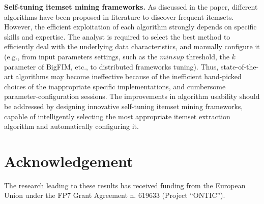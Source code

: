 \documentclass[preprint,review,12pt]{elsarticle}
\begin{document}
\textbf{Self-tuning itemset mining frameworks.} 
As discussed in the paper, different algorithms have been proposed in literature
to discover frequent itemsets. 
However, the efficient exploitation of each algorithm strongly depends on specific skills and expertise. 
The analyst is required to select the best method to efficiently deal with the
underlying data characteristics, 
and manually configure it 
(e.g., from input parameters settings, such as the $minsup$ threshold, the $k$ parameter of BigFIM, etc., to distributed frameworks tuning).
Thus, state-of-the-art algorithms may become ineffective because of the inefficient hand-picked choices 
of the inappropriate specific implementations, and cumbersome parameter-configuration sessions.
The improvements in algorithm usability should be addressed by designing innovative self-tuning itemset mining 
frameworks, capable of intelligently selecting the most appropriate itemset extraction algorithm 
and automatically configuring it.





\section*{Acknowledgement}
The research leading to these results has received funding from the European
Union under the FP7 Grant Agreement n. 619633 (Project ``ONTIC'').


\end{document}
